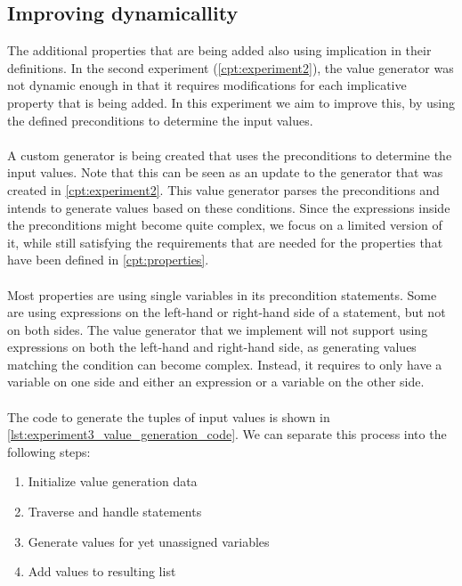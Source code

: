 \subsection{Improving dynamicallity}
The additional properties that are being added also using implication in their definitions. In the second experiment (\autoref{cpt:experiment2}), the value generator was not dynamic enough in that it requires modifications for each implicative property that is being added. In this experiment we aim to improve this, by using the defined preconditions to determine the input values.\\
\\
A custom generator is being created that uses the preconditions to determine the input values. Note that this can be seen as an update to the generator that was created in \autoref{cpt:experiment2}. This value generator parses the preconditions and intends to generate values based on these conditions. Since the expressions inside the preconditions might become quite complex, we focus on a limited version of it, while still satisfying the requirements that are needed for the properties that have been defined in \autoref{cpt:properties}.\\
\\
Most properties are using single variables in its precondition statements. Some are using expressions on the left-hand or right-hand side of a statement, but not on both sides. The value generator that we implement will not support using expressions on both the left-hand and right-hand side, as generating values matching the condition can become complex. Instead, it requires to only have a variable on one side and either an expression or a variable on the other side.\\
\\
The code to generate the tuples of input values is shown in \autoref{lst:experiment3_value_generation_code}. We can separate this process into the following steps:
\def \valueGeneratorStepOne{Initialize value generation data}
\def \valueGeneratorStepTwo{Traverse and handle statements}
\def \valueGeneratorStepThree{Generate values for yet unassigned variables}
\def \valueGeneratorStepFour{Add values to resulting list}
\begin{enumerate}
  \item \valueGeneratorStepOne
  \item \valueGeneratorStepTwo
  \item \valueGeneratorStepThree
  \item \valueGeneratorStepFour
\end{enumerate}
